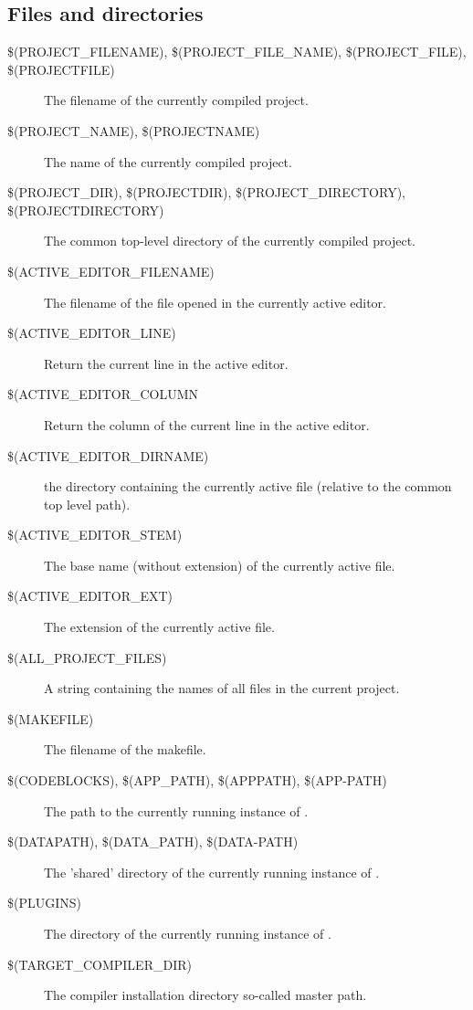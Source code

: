 \subsection{Files and directories}

\begin{description}
\item[{\footnotesize \$(PROJECT\_FILENAME), \$(PROJECT\_FILE\_NAME), \$(PROJECT\_FILE), \$(PROJECTFILE)}] The filename of the currently compiled project.
\item[{\footnotesize \$(PROJECT\_NAME), \$(PROJECTNAME)}] The name of the currently compiled project.
\item[{\footnotesize \$(PROJECT\_DIR), \$(PROJECTDIR), \$(PROJECT\_DIRECTORY), \$(PROJECTDIRECTORY)}] The common top-level directory of the currently compiled project.
\item[{\footnotesize \$(ACTIVE\_EDITOR\_FILENAME)}] The filename of the file opened in the currently active editor.
\item[{\footnotesize \$(ACTIVE\_EDITOR\_LINE)}] Return the current line in the active editor.
\item[{\footnotesize \$(ACTIVE\_EDITOR\_COLUMN}] Return the column of the current line in the active editor.
\item[{\footnotesize \$(ACTIVE\_EDITOR\_DIRNAME)}] the directory containing the currently active file (relative to the common top level path).
\item[{\footnotesize \$(ACTIVE\_EDITOR\_STEM)}] The base name (without extension) of the currently active file.
\item[{\footnotesize \$(ACTIVE\_EDITOR\_EXT)}] The extension of the currently active file.
\item[{\footnotesize \$(ALL\_PROJECT\_FILES)}] A string containing the names of all files in the current project.
\item[{\footnotesize \$(MAKEFILE)}] The filename of the makefile.
\item[{\footnotesize \$(CODEBLOCKS), \$(APP\_PATH), \$(APPPATH), \$(APP-PATH)}] The path to the currently running instance of \codeblocks.
\item[{\footnotesize \$(DATAPATH), \$(DATA\_PATH), \$(DATA-PATH)}] The 'shared' directory of the currently running instance of \codeblocks.
\item[{\footnotesize \$(PLUGINS)}] The  directory of the currently running instance of \codeblocks.
\item[{\footnotesize \$(TARGET\_COMPILER\_DIR)}] The compiler installation directory so-called master path.
\end{description}

